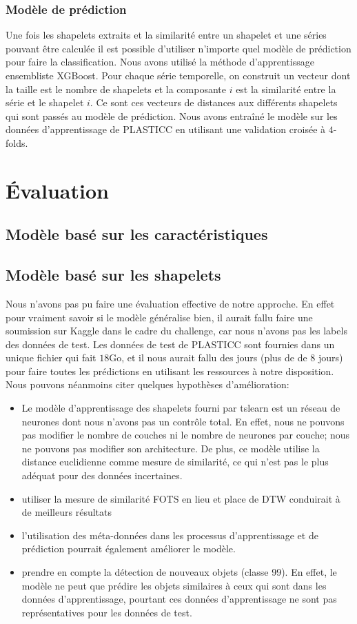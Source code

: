 \subsubsection{Modèle de prédiction}
Une fois les shapelets extraits et la similarité entre un shapelet et une séries pouvant être calculée il est possible d'utiliser n'importe quel modèle de prédiction pour faire la classification. Nous avons utilisé la méthode d'apprentissage ensembliste XGBoost\cite{chen2016xgboost}. Pour chaque série temporelle, on construit un vecteur dont la taille est le nombre de shapelets et la composante $ i $ est la similarité entre la série et le shapelet $ i $. Ce sont ces vecteurs de distances aux différents shapelets qui sont passés au modèle de prédiction. Nous avons entraîné le modèle sur les données d'apprentissage de PLASTICC en utilisant une validation croisée à $ 4 $-folds.

\section{Évaluation}
\subsection{Modèle basé sur les caractéristiques}

\subsection{Modèle basé sur les shapelets}
Nous n'avons pas pu faire une évaluation effective de notre approche. En effet pour vraiment savoir si le modèle généralise bien, il aurait fallu faire une soumission sur Kaggle dans le cadre du challenge, car nous n'avons pas les labels des données de test. Les données de test de PLASTICC sont fournies dans un unique fichier qui fait $ 18$Go, et il nous aurait fallu des jours (plus de de 8 jours) pour faire toutes les prédictions en utilisant les ressources à notre disposition. Nous pouvons néanmoins citer quelques hypothèses d'amélioration:
\begin{itemize}
    \item Le modèle d'apprentissage des shapelets fourni par tslearn est un réseau de neurones dont nous n'avons pas un contrôle total. En effet, nous ne pouvons pas modifier le nombre de couches ni le nombre de neurones par couche; nous ne pouvons pas modifier son architecture. De plus, ce modèle utilise la distance euclidienne comme mesure de similarité, ce qui n'est pas le plus adéquat pour des données incertaines.
    \item utiliser la mesure de similarité FOTS en lieu et place de DTW conduirait à de meilleurs résultats
    \item l'utilisation des méta-données dans les processus d'apprentissage et de prédiction pourrait également améliorer le modèle.
    \item prendre en compte la détection de nouveaux objets (classe 99). En effet, le modèle ne peut que prédire les objets similaires à ceux qui sont dans les données d'apprentissage, pourtant ces données d'apprentissage ne sont pas représentatives pour les données de test.
\end{itemize}